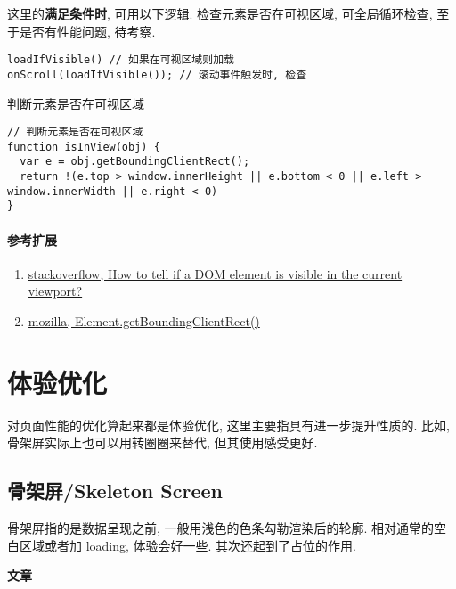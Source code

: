 这里的\textbf{满足条件时}, 可用以下逻辑. 检查元素是否在可视区域,
可全局循环检查, 至于是否有性能问题, 待考察.

\begin{lstlisting}
loadIfVisible() // 如果在可视区域则加载
onScroll(loadIfVisible()); // 滚动事件触发时, 检查
\end{lstlisting}

判断元素是否在可视区域

\begin{lstlisting}
// 判断元素是否在可视区域
function isInView(obj) {
  var e = obj.getBoundingClientRect();
  return !(e.top > window.innerHeight || e.bottom < 0 || e.left > window.innerWidth || e.right < 0)
}
\end{lstlisting}

\paragraph{参考扩展}\label{ux53c2ux8003ux6269ux5c55}

\begin{enumerate}
\def\labelenumi{\arabic{enumi}.}
\tightlist
\item
  \href{https://stackoverflow.com/questions/123999/how-to-tell-if-a-dom-element-is-visible-in-the-current-viewport\#7557433}{stackoverflow,
  How to tell if a DOM element is visible in the current viewport?}
\item
  \href{https://developer.mozilla.org/zh-CN/docs/Web/API/Element/getBoundingClientRect}{mozilla,
  Element.getBoundingClientRect()}
\end{enumerate}

\section{体验优化}\label{ux4f53ux9a8cux4f18ux5316}

对页面性能的优化算起来都是体验优化, 这里主要指具有进一步提升性质的.
比如, 骨架屏实际上也可以用转圈圈来替代, 但其使用感受更好.

\subsection{骨架屏/Skeleton
Screen}\label{ux9aa8ux67b6ux5c4fskeleton-screen}

骨架屏指的是数据呈现之前, 一般用浅色的色条勾勒渲染后的轮廓.
相对通常的空白区域或者加 loading, 体验会好一些. 其次还起到了占位的作用.

\textbf{文章}

